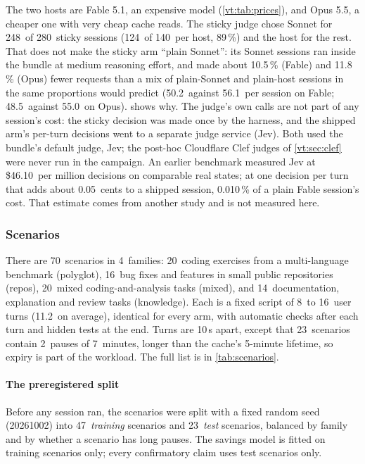 \documentclass[11pt,letterpaper]{article}
\newcommand{\term}[1]{\emph{#1}}
\newcommand{\CacheTTLMin}{5}
\newcommand{\FamKnowledge}{14}
\newcommand{\FamMixed}{20}
\newcommand{\FamPolyglot}{20}
\newcommand{\FamRepos}{16}
\newcommand{\JevPerMillion}{46.10}
\newcommand{\JudgeShippedCents}{0.05}
\newcommand{\JudgeShippedShare}{0.010}
\newcommand{\LongGapMin}{7}
\newcommand{\LongGapsPerScen}{2}
\newcommand{\MaxTurns}{16}
\newcommand{\MeanTurns}{11.2}
\newcommand{\MinTurns}{8}
\newcommand{\NFamilies}{4}
\newcommand{\NLongGapScen}{23}
\newcommand{\NScenarios}{70}
\newcommand{\NStickySessions}{280}
\newcommand{\NStickySonnetOnly}{248}
\newcommand{\NTest}{23}
\newcommand{\NTrain}{47}
\newcommand{\RvReqActFable}{50.2}
\newcommand{\RvReqActOpus}{48.5}
\newcommand{\RvReqGapFable}{10.5}
\newcommand{\RvReqGapOpus}{11.8}
\newcommand{\RvReqPredFable}{56.1}
\newcommand{\RvReqPredOpus}{55.0}
\newcommand{\ShortGapS}{10}
\newcommand{\SplitSeed}{20261002}
\newcommand{\StickyCheap}{124}
\newcommand{\StickyCheapPct}{89}
\newcommand{\StickyDecisions}{140}
\begin{document}
The two hosts are Fable 5.1, an expensive model (\cref{vt:tab:prices}), and Opus 5.5, a cheaper one with very
cheap cache reads. The sticky judge chose Sonnet for
\NStickySonnetOnly\ of \NStickySessions\ sticky sessions (\StickyCheap\ of \StickyDecisions\ per host,
\StickyCheapPct\,\%) and the host for the rest. That does not make the sticky arm ``plain Sonnet'': its Sonnet
sessions ran inside the bundle at medium reasoning effort, and made about \RvReqGapFable\,\% (Fable) and
\RvReqGapOpus\,\% (Opus) fewer requests than a mix of plain-Sonnet and plain-host sessions in the same proportions
would predict (\RvReqActFable\ against \RvReqPredFable\ per session on Fable; \RvReqActOpus\ against \RvReqPredOpus\ on
Opus).  shows why. The judge's own calls are not part of any session's cost: the sticky decision was made once by the
harness, and the shipped arm's per-turn decisions went to a separate judge service (Jev). Both used the bundle's
default judge, Jev; the post-hoc Cloudflare Clef judges of \cref{vt:sec:clef} were never run in the campaign. An earlier benchmark
measured Jev at \$\JevPerMillion\ per million decisions on comparable real states; at one decision per turn
that adds about \JudgeShippedCents\ cents to a shipped session, \JudgeShippedShare\,\% of a plain Fable
session's cost. That estimate comes from another study and is not measured here.

\subsubsection{Scenarios}

There are \NScenarios\ scenarios in \NFamilies\ families: \FamPolyglot\ coding exercises from a
multi-language benchmark (polyglot), \FamRepos\ bug fixes and features in small public repositories
(repos), \FamMixed\ mixed coding-and-analysis tasks (mixed), and \FamKnowledge\ documentation, explanation
and review tasks (knowledge). Each is a fixed script of \MinTurns\ to \MaxTurns\ user turns (\MeanTurns\ on
average), identical for every arm, with automatic checks after each turn and hidden tests at the end.
Turns are \ShortGapS\,s apart, except that \NLongGapScen\ scenarios contain \LongGapsPerScen\ pauses of
\LongGapMin\ minutes, longer than the cache's \CacheTTLMin-minute lifetime, so expiry is part of the
workload. The full list is in \cref{tab:scenarios}.

\paragraph{The preregistered split} Before any session ran, the scenarios were split with a fixed random
seed (\SplitSeed) into \NTrain\ \term{training} scenarios and \NTest\ \term{test} scenarios, balanced by
family and by whether a scenario has long pauses. The savings model is fitted on training scenarios only;
every confirmatory claim uses test scenarios only.
\end{document}
